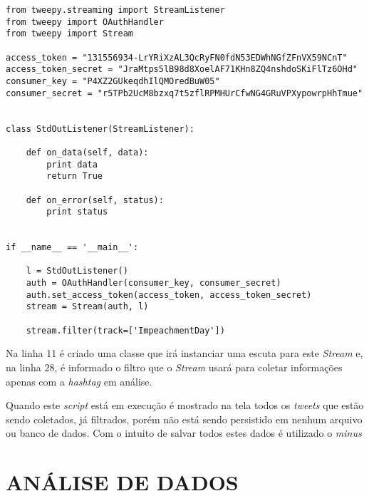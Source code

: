 \begin{lstlisting}
from tweepy.streaming import StreamListener
from tweepy import OAuthHandler
from tweepy import Stream

access_token = "131556934-LrYRiXzAL3QcRyFN0fdN53EDWhNGfZFnVX59NCnT"
access_token_secret = "JraMtps5lB98d8XoelAF71KHn8ZQ4nshdoSKiFlTz6OHd"
consumer_key = "P4XZ2GUkeqdhIlQMOredBuW05"
consumer_secret = "r5TPb2UcM8bzxq7t5zflRPMHUrCfwNG4GRuVPXypowrpHhTmue"


class StdOutListener(StreamListener):

    def on_data(self, data):
        print data
        return True

    def on_error(self, status):
        print status


if __name__ == '__main__':

    l = StdOutListener()
    auth = OAuthHandler(consumer_key, consumer_secret)
    auth.set_access_token(access_token, access_token_secret)
    stream = Stream(auth, l)

    stream.filter(track=['ImpeachmentDay'])

\end{lstlisting}

Na linha 11 é criado uma classe que irá instanciar uma escuta para este \textit{Stream} e, na linha 28, é informado o filtro que o \textit{Stream} usará para coletar informações apenas com a \textit{hashtag} em análise.

Quando este \textit{script} está em execução é mostrado na tela todos os \textit{tweets} que estão sendo coletados, já filtrados, porém não está sendo persistido em nenhum arquivo ou banco de dados. Com o intuito de salvar todos estes dados é utilizado o \textit{minus}



\section{ANÁLISE DE DADOS}